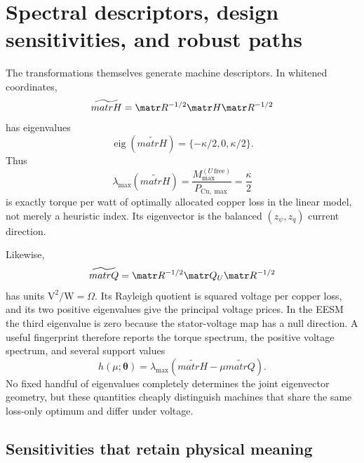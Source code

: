 \section{Spectral descriptors, design sensitivities, and robust paths}
\label{sec:design-descriptors}

The transformations themselves generate machine descriptors.  In whitened
coordinates,
\begin{equation}
 \widetilde{matr H}=\matr R^{-1/2}\matr H\matr R^{-1/2}
\end{equation}
has eigenvalues
\begin{equation}
 \operatorname{eig}(\widetilde{matr H})=
 \{-\kappa/2,0,\kappa/2\}.
 \label{eq:whitened-torque-spectrum}
\end{equation}
Thus
\begin{equation}
 \boxed{\lambda_{\max}(\widetilde{matr H})
 =\frac{M_{\max}^{(U\,\mathrm{free})}}{P_{\mathrm{Cu},\max}}
 =\frac{\kappa}{2}}
 \label{eq:spectral-capability}
\end{equation}
is exactly torque per watt of optimally allocated copper loss in the linear
model, not merely a heuristic index.  Its eigenvector is the balanced
\((z_\psi,z_q)\) current direction.

Likewise,
\begin{equation}
 \widetilde{matr Q}=\matr R^{-1/2}\matr Q_U\matr R^{-1/2}
\end{equation}
has units \(\mathrm{V^2/W}=\Omega\).  Its Rayleigh quotient is squared voltage
per copper loss, and its two positive eigenvalues give the principal voltage
prices.  In the EESM the third eigenvalue is zero because the stator-voltage
map has a null direction.  A useful fingerprint therefore reports the torque
spectrum, the positive voltage spectrum, and several support values
\begin{equation}
 h(\mu;\boldsymbol\theta)=
 \lambda_{\max}(\widetilde{matr H}-\mu\widetilde{matr Q}).
 \label{eq:spectral-support-fingerprint}
\end{equation}
No fixed handful of eigenvalues completely determines the joint eigenvector
geometry, but these quantities cheaply distinguish machines that share the
same loss-only optimum and differ under voltage.

\subsection{Sensitivities that retain physical meaning}

